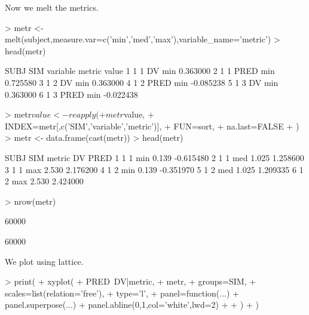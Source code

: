 Now we melt the metrics.
\begin{Schunk}
\begin{Sinput}
> metr <- melt(subject,measure.var=c('min','med','max'),variable_name='metric')
> head(metr)
\end{Sinput}
\begin{Soutput}
  SUBJ SIM variable metric     value
1    1   1       DV    min  0.363000
2    1   1     PRED    min  0.725580
3    1   2       DV    min  0.363000
4    1   2     PRED    min -0.085238
5    1   3       DV    min  0.363000
6    1   3     PRED    min -0.022438
\end{Soutput}
\begin{Sinput}
> metr$value <- reapply(
+ 	metr$value,
+ 	INDEX=metr[,c('SIM','variable','metric')],
+ 	FUN=sort,
+ 	na.last=FALSE
+ )
> metr <- data.frame(cast(metr))
> head(metr)
\end{Sinput}
\begin{Soutput}
  SUBJ SIM metric    DV      PRED
1    1   1    min 0.139 -0.615480
2    1   1    med 1.025  1.258600
3    1   1    max 2.530  2.176200
4    1   2    min 0.139 -0.351970
5    1   2    med 1.025  1.209335
6    1   2    max 2.530  2.424000
\end{Soutput}
\begin{Sinput}
> nrow(metr)
\end{Sinput}
\begin{Soutput}
[1] 60000
\end{Soutput}
\begin{Soutput}
[1] 60000
\end{Soutput}
\end{Schunk}
We plot using lattice.
\begin{Schunk}
\begin{Sinput}
> print(
+ 	xyplot(
+ 		PRED~DV|metric,
+ 		metr,
+ 		groups=SIM,
+ 		scales=list(relation='free'),
+ 		type='l',
+ 		panel=function(...){
+ 			panel.superpose(...)
+ 			panel.abline(0,1,col='white',lwd=2)
+ 		}
+ 	)
+ )
\end{Sinput}
\end{Schunk}
